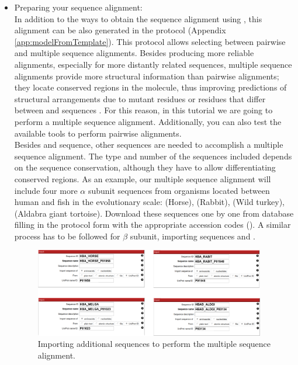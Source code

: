  \begin{itemize}
 \item Preparing your sequence alignment:\\
In addition to the ways to obtain the  sequence alignment using \chimera, this alignment can be also generated in the \scipion protocol  (Appendix \ref{app:modelFromTemplate}). This protocol allows selecting between pairwise and multiple sequence alignments. Besides producing more reliable alignments, especially for more distantly related sequences, multiple sequence alignments provide more structural information than pairwise alignments; they locate conserved regions in the molecule, thus improving predictions of structural arrangements due to mutant residues or residues that differ between  and  sequences \citep{pearson2013}. For this reason, in this tutorial we are going to perform a multiple sequence alignment. Additionally, you can also test the available tools to perform pairwise alignments.\\
 
Besides  and  sequence, other sequences are needed to accomplish a multiple sequence alignment. The type and number of the sequences included depends on the sequence conservation, although they have to allow differentiating conserved regions. As an example, our multiple sequence alignment will include four more  $\alpha$ subunit sequences from organisms located between human and fish in the evolutionary scale:  (Horse),  (Rabbit),  (Wild turkey),  (Aldabra giant tortoise). Download these sequences one by one from  database filling in the  protocol form with the appropriate accession codes (). A similar process has to be followed for  $\beta$ subunit, importing  sequences  and .

  \begin{figure}[H]
  \centering 
  \captionsetup{width=.7\linewidth} 
  \includegraphics[width=0.95\textwidth]{Images/Fig12}
  \caption{Importing additional sequences to perform the multiple sequence alignment.}
  \label{fig:multialignment_sequences}
  \end{figure}


\end{itemize}
